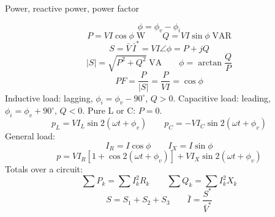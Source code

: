 Power, reactive power, power factor

$$\phi=\phi_v-\phi_i$$
$$P=VI\cos\phi\;\text{W}\qquad Q=VI\sin\phi\;\text{VAR}$$
$$S=\bar V\,\bar I^{*}=VI\angle\phi=P+jQ$$
$$\left|S\right|=\sqrt{P^2+Q^2}\;\text{VA}\qquad \phi=\arctan\frac{Q}{P}$$
$$PF=\frac{P}{\left|S\right|}=\frac{P}{VI}=\cos\phi$$
Inductive load: lagging, $\phi_i=\phi_v-90^{\circ}$, $Q>0$.
Capacitive load: leading, $\phi_i=\phi_v+90^{\circ}$, $Q<0$.
Pure L or C: $P=0$.
$$p_L=VI_L\sin2(\omega t+\phi_v)\qquad p_C=-VI_C\sin2(\omega t+\phi_v)$$
General load:
$$I_R=I\cos\phi\qquad I_X=I\sin\phi$$
$$p=VI_R\left[1+\cos2(\omega t+\phi_v)\right]+VI_X\sin2(\omega t+\phi_v)$$
Totals over a circuit:
$$\sum P_k=\sum I_k^2R_k\qquad \sum Q_k=\sum I_k^2X_k$$
$$S=S_1+S_2+S_3\qquad \bar I=\frac{S^{*}}{\bar V^{*}}$$
